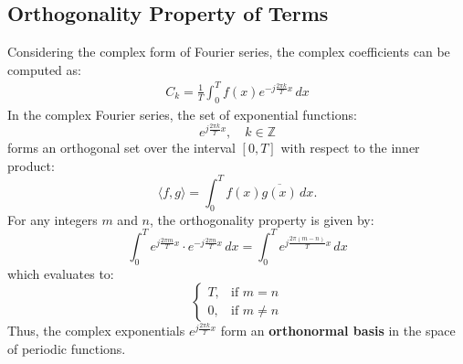 \begin{multicols}{2}
\subsection{Orthogonality Property of Terms}
Considering the complex form of Fourier series, the complex coefficients can be computed as:
\begin{align}
C_k = \frac{1}{T} \int_{0}^{T} f(x) e^{-j \frac{2\pi k}{T} x} \, dx 
\end{align}
In the complex Fourier series, the set of exponential functions:
\[
e^{j \frac{2\pi k}{T} x}, \quad k \in \mathbb{Z}
\]
forms an orthogonal set over the interval \( [0, T] \) with respect to the inner product:
\[
\langle f, g \rangle = \int_{0}^{T} f(x) \overline{g(x)} \, dx.
\]
For any integers \( m \) and \( n \), the orthogonality property is given by:
\[
\int_{0}^{T} e^{j \frac{2\pi m}{T} x} \cdot e^{-j \frac{2\pi n}{T} x} \, dx
= \int_{0}^{T} e^{j \frac{2\pi (m-n)}{T} x} \, dx
\]
which evaluates to:
\[
\begin{cases}
T, & \text{if } m = n \\
0, & \text{if } m \neq n
\end{cases}
\]
Thus, the complex exponentials \( e^{j \frac{2\pi k}{T} x} \) form an \textbf{orthonormal basis} in the space of periodic functions.


\end{multicols}
